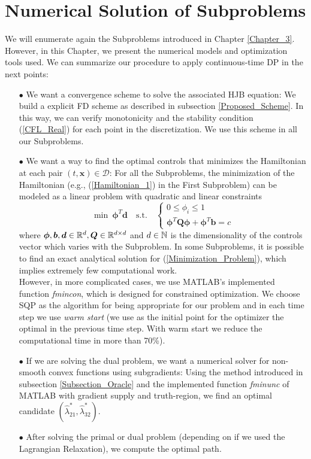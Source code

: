 \section{Numerical Solution of Subproblems}

We will enumerate again the Subproblems introduced in Chapter \ref{Chapter_3}. However, in this Chapter, we present the numerical models and optimization tools used. We can summarize our procedure to apply continuous-time DP in the next points:

\begin{enumerate}

\item[$\bullet$] We want a convergence scheme to solve the associated HJB equation: We build a explicit FD scheme as described in subsection \ref{Proposed_Scheme}. In this way, we can verify monotonicity and the stability condition (\ref{CFL_Real}) for each point in the discretization. We use this scheme in all our Subproblems.

\item[$\bullet$] We want a way to find the optimal controls that minimizes the Hamiltonian at each pair $(t,\bm{x})\in\mathcal{D}$: For all the Subproblems, the minimization of the Hamiltonian (e.g., (\ref{Hamiltonian_1}) in the First Subproblem) can be modeled as a linear problem with quadratic and linear constraints
\begin{equation}
\min\ \bm{\phi}^T\bm{d}\quad\text{s.t.}\quad\begin{cases}
0\leq\phi_i\leq1\\
\bm{\phi}^T\bm{Q}\bm{\phi}+\bm{\phi}^T\bm{b}=c
\end{cases}
\label{Minimization_Problem}
\end{equation}
where $\bm{\phi},\bm{b},\bm{d}\in\mathbb{R}^d,\bm{Q}\in\mathbb{R}^{d\times d}$ and $d\in\mathbb{N}$ is the dimensionality of the controls vector which varies with the Subproblem. In some Subproblems, it is possible to find an exact analytical solution for (\ref{Minimization_Problem}), which implies extremely few computational work.\\
However, in more complicated cases, we use MATLAB's implemented function \textit{fmincon}, which is designed for constrained optimization. We choose SQP as the algorithm for being appropriate for our problem and in each time step we use \textit{warm start} (we use as the initial point for the optimizer the optimal in the previous time step. With warm start we reduce the computational time in more than 70\%).

\item[$\bullet$] If we are solving the dual problem, we want a numerical solver for non-smooth convex functions using subgradients: Using the method introduced in subsection \ref{Subsection_Oracle} and the implemented function \textit{fminunc} of MATLAB with gradient supply and truth-region, we find an optimal candidate $(\hat{\lambda}_{21}^*,\hat{\lambda}_{32}^*)$.

\item[$\bullet$] After solving the primal or dual problem (depending on if we used the Lagrangian Relaxation), we compute the optimal path.

\end{enumerate}

